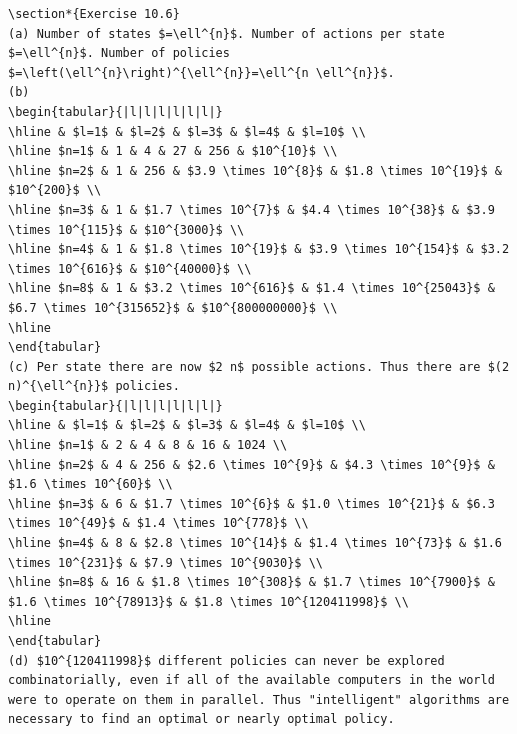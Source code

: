 \documentclass[10pt]{book}
\begin{document}
\begin{center}
\begin{enumerate}
\begin{center}
\begin{center}
\begin{center}
\begin{center}
\begin{center}
\begin{verbatim}
\section*{Exercise 10.6}
(a) Number of states $=\ell^{n}$. Number of actions per state $=\ell^{n}$. Number of policies $=\left(\ell^{n}\right)^{\ell^{n}}=\ell^{n \ell^{n}}$.
(b)
\begin{tabular}{|l|l|l|l|l|l|}
\hline & $l=1$ & $l=2$ & $l=3$ & $l=4$ & $l=10$ \\
\hline $n=1$ & 1 & 4 & 27 & 256 & $10^{10}$ \\
\hline $n=2$ & 1 & 256 & $3.9 \times 10^{8}$ & $1.8 \times 10^{19}$ & $10^{200}$ \\
\hline $n=3$ & 1 & $1.7 \times 10^{7}$ & $4.4 \times 10^{38}$ & $3.9 \times 10^{115}$ & $10^{3000}$ \\
\hline $n=4$ & 1 & $1.8 \times 10^{19}$ & $3.9 \times 10^{154}$ & $3.2 \times 10^{616}$ & $10^{40000}$ \\
\hline $n=8$ & 1 & $3.2 \times 10^{616}$ & $1.4 \times 10^{25043}$ & $6.7 \times 10^{315652}$ & $10^{800000000}$ \\
\hline
\end{tabular}
(c) Per state there are now $2 n$ possible actions. Thus there are $(2 n)^{\ell^{n}}$ policies.
\begin{tabular}{|l|l|l|l|l|l|}
\hline & $l=1$ & $l=2$ & $l=3$ & $l=4$ & $l=10$ \\
\hline $n=1$ & 2 & 4 & 8 & 16 & 1024 \\
\hline $n=2$ & 4 & 256 & $2.6 \times 10^{9}$ & $4.3 \times 10^{9}$ & $1.6 \times 10^{60}$ \\
\hline $n=3$ & 6 & $1.7 \times 10^{6}$ & $1.0 \times 10^{21}$ & $6.3 \times 10^{49}$ & $1.4 \times 10^{778}$ \\
\hline $n=4$ & 8 & $2.8 \times 10^{14}$ & $1.4 \times 10^{73}$ & $1.6 \times 10^{231}$ & $7.9 \times 10^{9030}$ \\
\hline $n=8$ & 16 & $1.8 \times 10^{308}$ & $1.7 \times 10^{7900}$ & $1.6 \times 10^{78913}$ & $1.8 \times 10^{120411998}$ \\
\hline
\end{tabular}
(d) $10^{120411998}$ different policies can never be explored combinatorially, even if all of the available computers in the world were to operate on them in parallel. Thus "intelligent" algorithms are necessary to find an optimal or nearly optimal policy.


\end{verbatim}
\end{center}
\end{center}
\end{center}
\end{center}
\end{center}
\end{enumerate}
\end{center}
\end{document}
